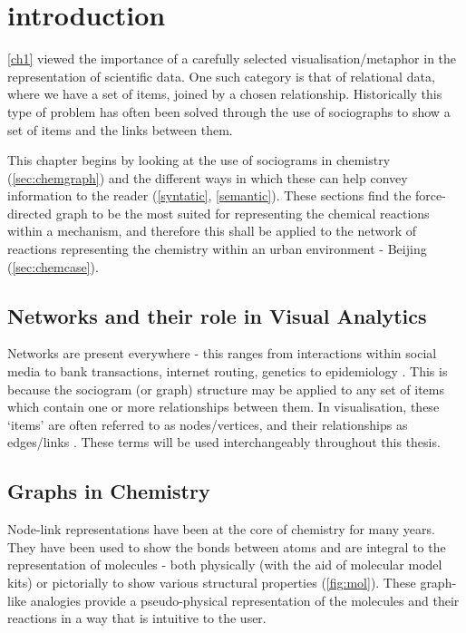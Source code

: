 
\section{introduction}
\autoref{ch1} viewed the importance of a carefully selected visualisation/metaphor in the representation of scientific data. One such category is that of relational data, where we have a set of items, joined by a chosen relationship. Historically
this type of problem has often been solved through the use of sociographs to show a set of items and the links between them. 

This chapter begins by looking at the use of sociograms in chemistry (\autoref{sec:chemgraph}) and the different ways in which these can help convey information to the reader (\autoref{syntatic}, \autoref{semantic}). These sections find the force-directed graph to be the most suited for representing the chemical reactions within a mechanism, and therefore this shall be applied to the network of reactions representing the chemistry within an urban environment - Beijing (\autoref{sec:chemcase}).


\subsection{Networks and their role in Visual Analytics} \label{sec:va}
Networks are present everywhere - this ranges from interactions within social media to bank transactions, internet routing, genetics to epidemiology \citep{worldmap, epidim,neoj4,netneuro,prbank,ch4,ch8,ch9}. This is because the sociogram (or graph) structure may be applied to any set of items which contain one or more relationships between them. In visualisation, these `items' are often referred to as nodes/vertices, and their relationships as edges/links \citep{ch1}. These terms will be used interchangeably throughout this thesis. 


\subsection{Graphs in Chemistry}\label{sec:chemgraph}
Node-link representations have been at the core of chemistry for many years. They have been used to show the bonds between atoms and are integral to the representation of molecules - both physically (with the aid of molecular model kits) or pictorially to show various structural properties (\autoref{fig:mol}). These graph-like analogies provide a pseudo-physical representation of the molecules and their reactions in a way that is intuitive to the user. 




